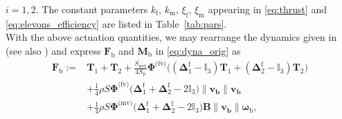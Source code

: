 $i=1,2$. The constant parameters $k_{\text{f}}$, $k_{\text{m}}$, $\xi_{\text{f}}$, $\xi_{\text{m}}$ appearing in \eqref{eq:thrust} and \eqref{eq:elevons_efficiency} are listed in Table~\ref{tab:pars}.\\
With the above actuation quantities, we may rearrange the dynamics given in \cite[eqns (97),~(98)]{lustosa:hal-03035938} (see also \cite{sansou:stage}) and express $\boldsymbol{F}_{\text{b}}$ and $\boldsymbol{M}_{\text{b}}$ in \eqref{eq:dyna_orig} as
%
\begin{align}
\nonumber
    \boldsymbol{F}_{\text{b}} :={}&  \boldsymbol{T}_{1} + \boldsymbol{T}_{2} + \frac{S_{\text{wet}}}{4S_{\text{p}}} \boldsymbol{\Phi}^{\text{(fv)}} \Big( (\boldsymbol{\Delta}^{\text{f}}_1 - \mathbb{I}_{3} ) \boldsymbol{T}_{1} + ( \boldsymbol{\Delta}^{\text{f}}_2 - \mathbb{I}_{3}) \boldsymbol{T}_{2}\Big) \\ 
     \label{eq:Fb}
    &+ \frac{1}{4} \rho S  \boldsymbol{\Phi}^{\text{(fv)}} \Big(\boldsymbol{\Delta}^{\text{f}}_1+ \boldsymbol{\Delta}^{\text{f}}_2 - 2 \mathbb{I}_{3} \Big) \lVert \boldsymbol{v_{\text{b}}} \rVert \boldsymbol{v_{\text{b}}}\\
    \nonumber
    &+ \frac{1}{4} \rho S \boldsymbol{\Phi}^{\text{(mv)}} \Big(\boldsymbol{\Delta}^{\text{f}}_1 + \boldsymbol{\Delta}^{\text{f}}_2 - 2\mathbb{I}_{3}\Big) \boldsymbol{B} \lVert \boldsymbol{v_{\text{b}}} \rVert  \boldsymbol{\omega}_{\text{b}}, 
\end{align}
% 
